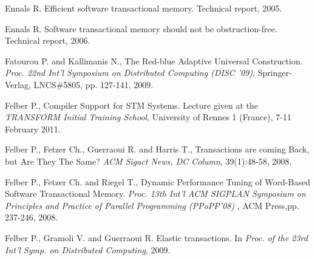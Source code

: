 \begin{thebibliography}{99}
{
Ennals R.
\newblock Efficient software transactional memory.
\newblock Technical report, 2005.

Ennals R.
\newblock Software transactional memory should not be obstruction-free.
\newblock Technical report, 2006.





Fatourou P. and Kallimanis N., 
The Red-blue Adaptive Universal Construction. 
{\it  Proc. 22nd  Int'l  Symposium on Distributed Computing
(DISC '09)},  Springer-Verlag, LNCS\#5805, pp. 127-141,  2009. 



Felber P., 
Compiler Support for STM Systems. 
Lecture given at the  {\it TRANSFORM  Initial Training School},  University
of Rennes  1 (France), 7-11 February 2011. 






Felber P., Fetzer Ch., Guerraoui R. and Harris T., 
Transactions are coming Back, but Are They The Same?
{\it ACM Sigact News, DC Column}, 39(1):48-58, 2008.

Felber P.,  Fetzer Ch. and  Riegel T., 
Dynamic Performance Tuning of Word-Based Software Transactional Memory. 
{\it  Proc. 13th  Int'l  ACM SIGPLAN Symposium on Principles and
 Practice of Parallel Programming (PPoPP'08) },  ACM Press,pp. 237-246,  2008. 




Felber P., Gramoli V. and Guerraoui R.
\newblock Elastic transactions.
\newblock In {\em Proc. of the 23rd Int'l Symp. on Distributed Computing},
  2009.

% 
% 
% 


}
\end{thebibliography}
